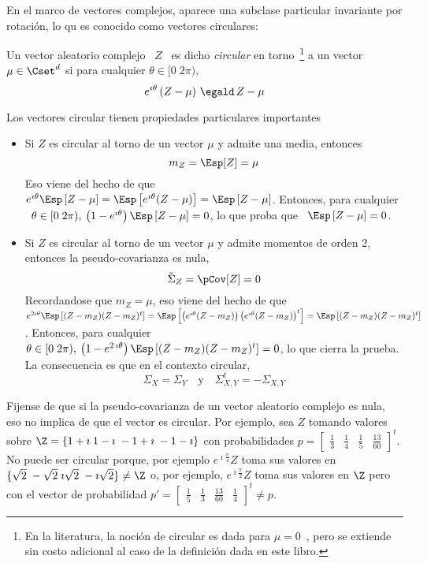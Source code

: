 En el  marco de vectores  complejos, aparece una subclase  particular invariante
por rotaci\'on, lo qu es conocido como vectores circulares:
%
\begin{definicion}\label{Def:MP:VectorAleatorioComplejoCircular}
%
  Un  vector   aleatorio  complejo   \  $Z$  \   es  dicho  {\em   circular}  en
  torno~\footnote{En la literatura, la noci\'on  de circular es dada para $\mu =
    0$~\cite[Def.~24.3.2]{Lap17}, pero  se extiende sin costo  adicional al caso
    de la  definici\'on dada en este libro.}   a un vector $\mu  \in \Cset^d$ si
  para cualquier $\theta \in [0 \; 2 \pi)$,
  \[
  e^{\imath \theta} \left( Z - \mu \right) \, \egald \, Z - \mu
  \]
\end{definicion}

Los vectores circular tienen propiedades particulares importantes
%
\begin{itemize}
\item  Si $Z$  es circular  al torno  de  un vector  $\mu$ y  admite una  media,
  entonces
  \[
  m_Z = \Esp[Z] = \mu
  \]
  Eso viene  del hecho de  que $e^{\imath \theta}  \Esp\left[ Z - \mu  \right] =
  \Esp\left[  e^{\imath  \theta}  (Z  -  \mu)  \right]  =  \Esp\left[  Z  -  \mu
  \right]$. Entonces,  para cualquier \ $\theta \in  [0 \; 2 \pi),  \: \left(1 -
    e^{\imath \theta} \right) \Esp\left[ Z -  \mu \right] = 0$, lo que proba que
  \ $\Esp\left[ Z - \mu \right] = 0$.
%
\item Si $Z$ es circular al torno  de un vector $\mu$ y admite momentos de orden
  2, entonces la pseudo-covarianza es  nula,
  \[
  \check{\Sigma}_Z = \pCov[Z] = 0
  \]
  Recordandose que $m_Z = \mu$, eso  viene del hecho de que $e^{2 \imath \theta}
  \Esp\left[ (Z - m_Z) (Z - m_Z)^t \right] = \Esp\left[ \left( e^{\imath \theta}
      (Z - m_Z)  \right) \left( e^{\imath \theta} (Z -  m_Z) \right)^t \right] =
  \Esp\left[ (Z - m_Z) (Z - m_Z)^t \right]$.  Entonces, para cualquier \ $\theta
  \in [0 \; 2 \pi), \: \left(1  - e^{2 \, \imath \theta} \right) \Esp\left[ (Z -
    m_Z) (Z - m_Z)^t  \right] = 0$, lo que cierra la  prueba. La consecuencia es
  que en el contexto circular,
  \[
  \Sigma_X = \Sigma_Y \quad \mbox{y} \quad \Sigma_{X,Y}^t = - \Sigma_{X,Y}
  \]
\end{itemize}

Fijense de que si la pseudo-covarianza  de un vector aleatorio complejo es nula,
eso  no implica de  que el  vector es  circular.  Por  ejemplo, sea  $Z$ tomando
valores sobre  $\Z = \{ 1+\imath \;  1-\imath \; -1+\imath \;  -1-\imath \}$ con
probabilidades   $p  =   \begin{bmatrix}   \frac13  &   \frac14   &  \frac15   &
  \frac{13}{60}  \end{bmatrix}^t$. No  puede  ser circular  porque, por  ejemplo
$e^{\imath \frac{\pi}{4}} Z$ toma sus valores en $\{ \sqrt2 \; -\sqrt2 \; \imath
\sqrt2 \; -\imath \sqrt2 \} \ne \Z$ o, por ejemplo, $e^{\imath \frac{\pi}{2}} Z$
toma   sus  valores   en  $\Z$   pero  con   el  vector   de   probabilidad  $p'
= \begin{bmatrix} \frac15 & \frac13 & \frac{13}{60} & \frac14\end{bmatrix}^t \ne
p$.


